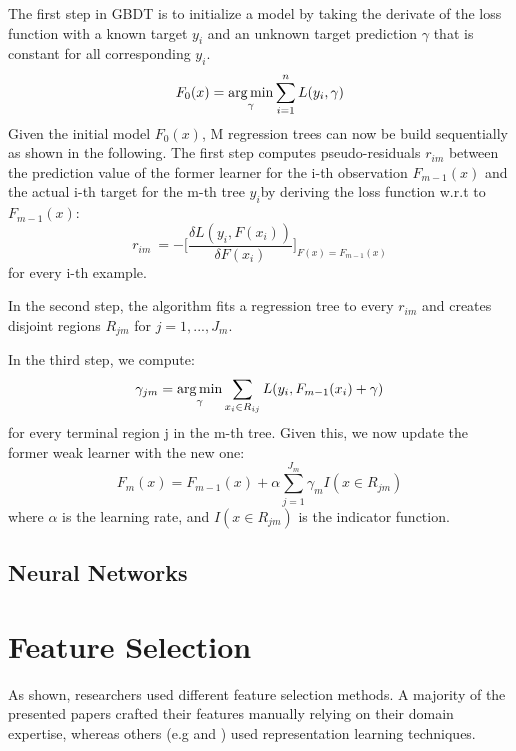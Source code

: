 The first step in GBDT is to initialize a model by taking the derivate of the loss function with a known target $ y_i $ and an unknown target prediction $ \gamma $ that is constant for all corresponding $ y_i $.
\begin{equation}
F_{0}(x) =  \operatorname*{arg\,min}_{\gamma} \sum_{i=1}^n L(y_i,\gamma) \label{gbdt_step1}
\end{equation}
Given the initial model $ F_0(x) $, M regression trees can now be build sequentially as shown in the following. 
The first step computes pseudo-residuals $ r_{im} $ between the prediction value of the former learner for the i-th observation $ F_{m-1}(x) $ and the actual i-th target for the m-th tree $ y_i $by deriving the loss function w.r.t to $ F_{m-1}(x) $: 
\begin{equation}
	r_{im}\ = - \bigg[\dfrac{\delta L(y_i, F(x_i))}{\delta F(x_i)}\bigg]_{F(x) = F_{m-1}(x)}
\end{equation} 
for every i-th example.

In the second step, the algorithm fits a regression tree to every $ r_{im} $ and creates disjoint regions $ R_{jm} $ for $j = 1, ..., J_m$. 

In the third step, we compute: 
\begin{equation}
	\gamma_{jm} = \operatorname*{arg\,min}_{\gamma} \sum_{x_i \in R_{ij}} L(y_i, F_{m-1}(x_i) + \gamma)
\end{equation}
for every terminal region j in the m-th tree. 
Given this, we now update the former weak learner with the new one:
\begin{equation}
	F_m(x) = F_{m-1}(x) + \alpha \sum_{j=1}^{J_m} \gamma_{m}I(x \in R_{jm})
\end{equation}
where $ \alpha $ is the learning rate, and $ I(x \in R_{jm}) $ is the indicator function.

\subsection{Neural Networks}

\section{Feature Selection}

As shown, researchers used different feature selection methods. A majority of the presented papers crafted their features manually relying on their domain expertise, whereas others (e.g \cite{Siripanpornchana2016_AnnWithDbnFS} and \cite{Huang2018_GBDT}) used representation learning techniques.


